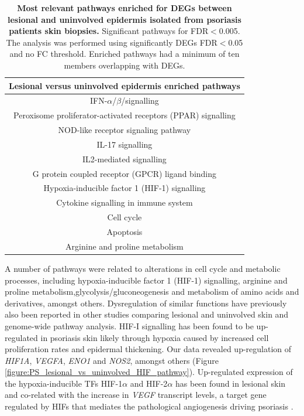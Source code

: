 \begin{table}[htbp]
\centering
\begin{tabular}{@{}c}
\toprule
\textbf{Lesional versus uninvolved epidermis enriched pathways} \\
\midrule
\midrule
IFN-$\alpha$/$\beta$/signalling \\
Peroxisome proliferator-activated receptors (PPAR) signalling \\
NOD-like receptor signaling pathway \\
IL-17 signalling \\
IL2-mediated signalling \\
G protein coupled receptor (GPCR) ligand binding \\
Hypoxia-inducible factor 1 (HIF-1) signalling \\
Cytokine signalling in immune system \\
Cell cycle \\
Apoptosis \\
Arginine and proline metabolism \\
\bottomrule
\end{tabular}
\medskip %
\caption[Most relevant pathways enriched for DEGs between lesional and uninvolved epidermis isolated from psoriasis patients skin biopsies.]{\textbf{Most relevant pathways enriched for DEGs between lesional and uninvolved epidermis isolated from psoriasis patients skin biopsies.} Significant pathways for FDR$<$0.005. The analysis was performed using significantly DEGs FDR$<$0.05 and no FC threshold. Enriched pathways had a minimum of ten members overlapping with DEGs.}
\label{tab:RNAseq_PS_lesional_uninvolved_pathway_enrichment}
\end{table}


A number of pathways were related to alterations in cell cycle and metabolic processes, including hypoxia-inducible factor 1 (HIF-1) signalling, arginine and proline metabolism,glycolysis/gluconeogenesis and metabolism of amino acids and derivatives, amongst others. Dysregulation of similar functions have previously also been reported in other studies comparing lesional and uninvolved skin and genome-wide pathway analysis\parencite{Coda2012, Aterido2016, Tervaniemi2016}. HIF-I signalling has been found to be up-regulated in psoriasis skin likely through hypoxia caused by increased cell proliferation rates and epidermal thickening. Our data revealed up-regulation of \textit{HIF1A}, \textit{VEGFA}, \textit{ENO1} and \textit{NOS2}, amongst others (Figure \ref{figure:PS_lesional_vs_uninvolved_HIF_pathway}). Up-regulated expression of the hypoxia-inducible TFs HIF-1$\alpha$ and HIF-2$\alpha$ has been found in lesional skin and co-related with the increase in \textit{VEGF} transcript levels, a target gene regulated by HIFs that mediates the pathological angiogenesis driving psoriasis \parencite{Rosenberg2007}. 

